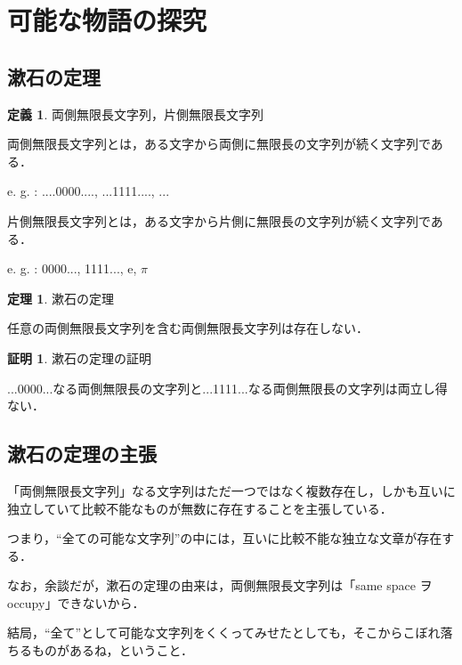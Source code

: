 \documentclass[10pt, a5paper, twoside]{jsarticle}
\theoremstyle{definition}
\newtheorem{dfn}{定義}
\newtheorem{thm}{定理}
\newtheorem{prf}{証明}
\begin{document}
	\section{可能な物語の探究}

		\subsection{漱石の定理}

		\begin{dfn}
			
			両側無限長文字列，片側無限長文字列

			両側無限長文字列とは，ある文字から両側に無限長の文字列が続く文字列である．

			e. g. : ....0000...., ...1111...., ... 

			片側無限長文字列とは，ある文字から片側に無限長の文字列が続く文字列である．

			e. g. : 0000..., 1111..., e, $\pi$
		
		\end{dfn}

		\begin{thm}

			漱石の定理
			
			任意の両側無限長文字列を含む両側無限長文字列は存在しない．
		
		\end{thm}

		\begin{prf}

			漱石の定理の証明

			...0000...なる両側無限長の文字列と...1111...なる両側無限長の文字列は両立し得ない．
		
		\end{prf}

		\subsection{漱石の定理の主張}

		「両側無限長文字列」なる文字列はただ一つではなく複数存在し，しかも互いに独立していて比較不能なものが無数に存在することを主張している．

		つまり，“全ての可能な文字列”の中には，互いに比較不能な独立な文章が存在する．

		なお，余談だが，漱石の定理の由来は，両側無限長文字列は「same space ヲ occupy\cite{ssk}」できないから．

		結局，“全て”として可能な文字列をくくってみせたとしても，そこからこぼれ落ちるものがあるね，ということ．
\end{document}
